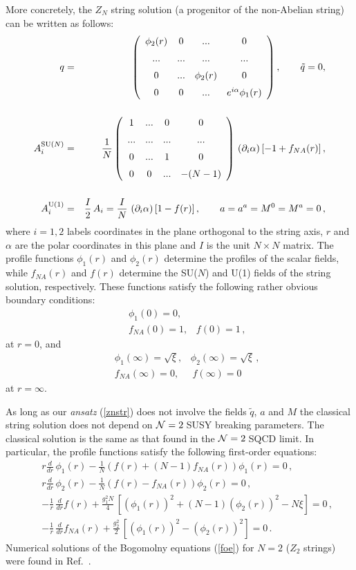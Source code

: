 \documentclass[epsfig,12pt]{article}
\def\beqn{\begin{eqnarray}}
\def\eeqn{\end{eqnarray}}
\newcommand{\ntwo}{${\cal N}=2\;$}
\newcommand{\pt}{\partial}
\begin{document}
More concretely,  the $Z_N$ string solution
(a progenitor of the non-Abelian string) can be written \cite{ABEKY} as
follows:
\beqn
q &=&
\left(
\begin{array}{cccc}
\phi_2(r) & 0& ... & 0\\[2mm]
...&...&...&...\\[2mm]
0& ... & \phi_2(r)&  0\\[2mm]
0 & 0& ... & e^{i\alpha}\phi_{1}(r)
\end{array}
\right) ,\qquad \tilde{q}=0,
\nonumber\\[5mm]
A^{{\rm SU}(N)}_i &=&
\frac1N\left(
\begin{array}{cccc}
1 & ... & 0 & 0\\[2mm]
...&...&...&...\\[2mm]
0&  ... & 1 & 0\\[2mm]
0 & 0& ... & -(N-1)
\end{array}
\right)\, \left( \pt_i \alpha \right) \left[ -1+f_{NA}(r)\right] ,
\nonumber\\[5mm]
A^{{\rm U}(1)}_i &=& \frac{I}{2}\,A_i=\frac{I}{N}\,
\left( \pt_i \alpha \right)\left[1-f(r)\right] ,\qquad
a=a^a=M^0=M^a=0\,,
\label{znstr}
\eeqn
where $i=1,2$ labels coordinates in the plane orthogonal to the string
axis, $r$ and $\alpha$ are the polar coordinates in this plane
and $I$ is the unit $N\times N$ matrix. The profile
functions $\phi_1(r)$ and  $\phi_2(r)$ determine the profiles of the scalar
fields,
while $f_{NA}(r)$ and $f(r)$ determine the SU($N$) and U(1) fields of the
string solution, respectively. These functions satisfy the following rather obvious
 boundary conditions:
\beqn
&& \phi_{1}(0)=0,
\nonumber\\[2mm]
&& f_{NA}(0)=1,\;\;\;f(0)=1\,,
\label{bc0}
\eeqn
at $r=0$, and
\beqn
&& \phi_{1}(\infty)=\sqrt{\xi},\;\;\;\phi_2(\infty)=\sqrt{\xi}\,,
\nonumber\\[2mm]
&& f_{NA}(\infty)=0,\;\;\;\; \; f(\infty) = 0
\label{bcinfty}
\eeqn
at $r=\infty$.

\vspace{2mm}

As long as our  {\em ansatz} (\ref{znstr}) does not involve the fields $\tilde{q}$, $a$ and $M$
the classical string solution does not depend on \ntwo SUSY breaking parameters.
The classical solution is the same as that found  \cite{ABEKY} in the \ntwo SQCD limit. In particular, the profile  functions satisfy the following first-order equations:
\beqn
&&
r\frac{d}{{d}r}\,\phi_1 (r)- \frac1N\left( f(r)
+ (N-1) f_{NA}(r) \right)\phi_1 (r) = 0\, ,
\nonumber\\[4mm]
&&
r\frac{d}{{ d}r}\,\phi_2 (r)- \frac1N\left(f(r)
-  f_{NA}(r)\right)\phi_2 (r) = 0\, ,
\nonumber\\[4mm]
&&
-\frac1r\,\frac{ d}{{ d}r} f(r)+\frac{g^2_1N}{4}\,
\left[\left(\phi_1(r)\right)^2 +(N-1)\left(\phi_2(r)\right)^2-N\xi\right] =
0\, ,
\nonumber\\[4mm]
&&
-\frac1r\,\frac{d}{{ d}r} f_{NA}(r)+\frac{g^2_2}{2}\,
\left[\left(\phi_1(r)\right)^2 -\left(\phi_2(r)\right)^2\right]  = 0
\, .
\label{foe}
\eeqn
Numerical solutions of the
Bogomolny equations (\ref{foe}) for $N=2$   ($Z_2$ strings) were
found in Ref.~\cite{ABEKY}.
\end{document}
